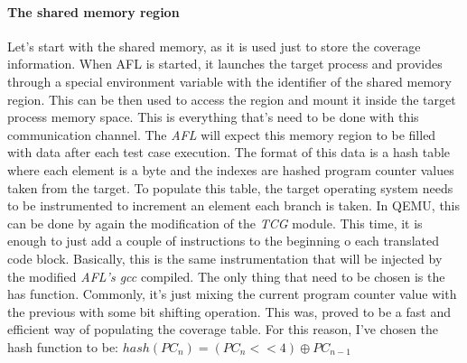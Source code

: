 \paragraph{The shared memory region}
Let's start with the shared memory, as it is used just to store the coverage information. When AFL is started, it launches the target process and provides through a special environment variable with the identifier of the shared memory region. This can be then used to access the region and mount it inside the target process memory space. This is everything that's need to be done with this communication channel. The \textit{AFL} will expect this memory region to be filled with data after each test case execution. The format of this data is a hash table where each element is a byte and the indexes are hashed program counter values taken from the target. To populate this table, the target operating system needs to be instrumented to increment an element each branch is taken. In QEMU, this can be done by again the modification of the \textit{TCG} module. This time, it is enough to just add a couple of instructions to the beginning o each translated code block. Basically, this is the same instrumentation that will be injected by the modified \textit{AFL's gcc} compiled. The only thing that need to be chosen is the has function. Commonly, it's just mixing the current program counter value with the previous with some bit shifting operation. This was, proved to be a fast and efficient way of populating the coverage table. For this reason, I've chosen the hash function to be: $hash(PC_n) = (PC_n << 4) \oplus PC_{n-1}$


